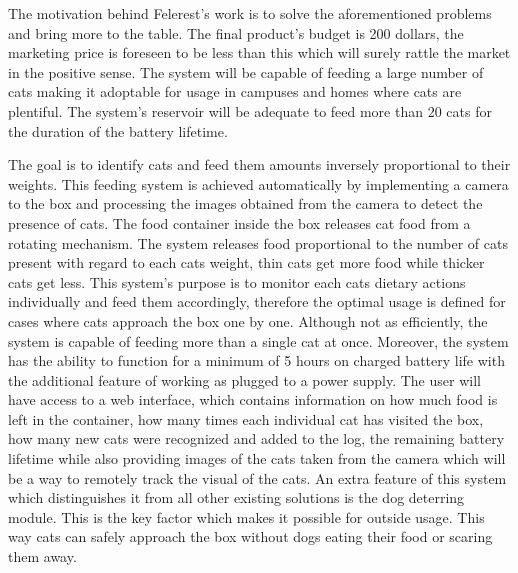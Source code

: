 
The motivation behind Felerest's work is to solve the aforementioned problems and bring more to the table. The final product's budget is 200 dollars, the marketing price is foreseen to be less than this which will surely rattle the market in the positive sense. The system will be capable of feeding a large number of cats making it adoptable for usage in campuses and homes where cats are plentiful. The system's reservoir will be adequate to feed more than 20 cats for the duration of the battery lifetime.

The goal is to identify cats and feed them amounts inversely proportional to their weights. This feeding system is achieved automatically by implementing a camera to the box and processing the images obtained from the camera to detect the presence of cats. The food container inside the box releases cat food from a rotating mechanism. The system releases food proportional to the number of cats present with regard to each cats weight, thin cats get more food while thicker cats get less. This system's purpose is to monitor each cats dietary actions individually and feed them accordingly, therefore the optimal usage is defined for cases where cats approach the box one by one. Although not as efficiently, the system is capable of feeding more than a single cat at once. Moreover, the system has the ability to function for a minimum of 5 hours on charged battery life with the additional feature of working as plugged to a power supply. The user will have access to a web interface, which contains information on how much food is left in the container, how many times each individual cat has visited the box, how many new cats were recognized and added to the log, the remaining battery lifetime while also providing images of the cats taken from the camera which will be a way to remotely track the visual of the cats. An extra feature of this system which distinguishes it from all other existing solutions is the dog deterring module. This is the key factor which makes it possible for outside usage. This way cats can safely approach the box without dogs eating their food or scaring them away. 


